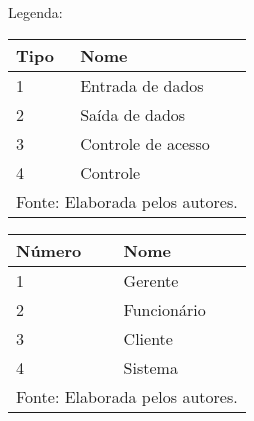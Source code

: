 \vspace{0.5cm}

Legenda:


\begin{center}
    \begin{minipage}{0.4\textwidth}
        \centering
        \begin{tabular} { | l | l |}
            \hline
            \textbf{Tipo} \cellcolor{cinza_claro} & \textbf{Nome}  \cellcolor{cinza_claro}   \\ \hline
            1              & Entrada de dados   \\ \hline
            2              & Saída de dados     \\ \hline
            3              & Controle de acesso \\ \hline
            4              & Controle           \\ \hline
        
            \multicolumn{2}{l}{Fonte: Elaborada pelos autores.}
        \end{tabular}
    \end{minipage}
    \hspace{1cm}
    \begin{minipage}{0.4\textwidth}
        \centering
        \begin{tabular} { | l | l |}
            \hline
            \textbf{Número}  \cellcolor{cinza_claro} & \textbf{Nome} \cellcolor{cinza_claro} \\ \hline
            1                       & Gerente            \\ \hline
            2                       & Funcionário        \\ \hline
            3                       & Cliente            \\ \hline
            4                       & Sistema            \\ \hline
            
            \multicolumn{2}{l}{Fonte: Elaborada pelos autores.}
        \end{tabular}
    \end{minipage}
\end{center}
